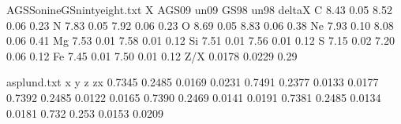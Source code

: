\begin{filecontents}{AGSSonineGSnintyeight.txt}
X AGS09 un09 GS98 un98 deltaX
C 8.43 0.05 8.52 0.06 0.23
N 7.83 0.05 7.92 0.06 0.23
O 8.69 0.05 8.83 0.06 0.38
Ne 7.93 0.10 8.08 0.06 0.41
Mg 7.53 0.01 7.58 0.01 0.12
Si 7.51 0.01 7.56 0.01 0.12
S 7.15 0.02 7.20 0.06 0.12
Fe 7.45 0.01 7.50 0.01 0.12
Z/X 0.0178 0.0229 0.29
\end{filecontents}


\begin{filecontents}{asplund.txt}
x y z zx%
0.7345 0.2485 0.0169 0.0231%
0.7491 0.2377 0.0133 0.0177%
0.7392 0.2485 0.0122 0.0165%
0.7390 0.2469 0.0141 0.0191%
0.7381 0.2485 0.0134 0.0181%
0.732 0.253 0.0153 0.0209
\end{filecontents}

